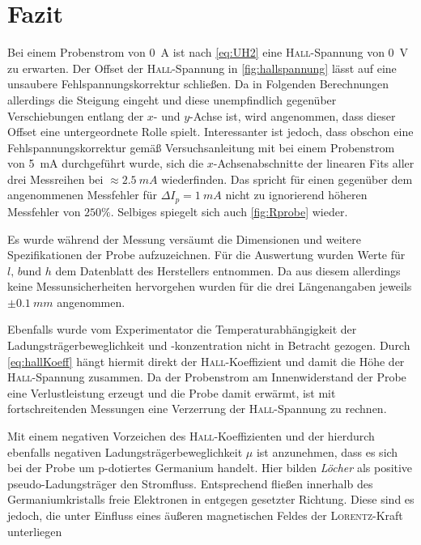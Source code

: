 \chapter{Fazit}
Bei einem Probenstrom von \SI{0}{A} ist nach \cref{eq:UH2} eine \textsc{Hall}-Spannung von \SI{0}{V} zu erwarten. Der Offset
der \textsc{Hall}-Spannung in \cref{fig:hallspannung} lässt auf eine unsaubere Fehlspannungskorrektur schließen. Da in Folgenden
Berechnungen allerdings die Steigung eingeht und diese unempfindlich gegenüber Verschiebungen entlang der \(x\)- und \(y\)-Achse
ist, wird angenommen, dass dieser Offset eine untergeordnete Rolle spielt. Interessanter ist jedoch, dass obschon eine
Fehlspannungskorrektur gemäß Versuchsanleitung mit bei einem Probenstrom von \SI{5}{mA} durchgeführt wurde, sich die
\(x\)-Achsenabschnitte der linearen Fits aller drei Messreihen bei \(\approx \SI{2,5}{mA}\) wiederfinden. Das spricht für
einen gegenüber dem angenommenen Messfehler für \(\Delta I_p = \SI{1}{mA}\) nicht zu ignorierend höheren Messfehler von
\(250\%\). Selbiges spiegelt sich auch \cref{fig:Rprobe} wieder.
\par\medskip
Es wurde während der Messung versäumt die Dimensionen und weitere Spezifikationen der Probe aufzuzeichnen. Für die Auswertung
wurden Werte für \(l\text{, }b\text{und }h\) dem Datenblatt des Herstellers \autocite{PHYWESystemeGmbHundCo.KG.} entnommen.
Da aus diesem allerdings keine Messunsicherheiten hervorgehen wurden für die drei Längenangaben jeweils \(\pm\SI{0,1}{mm}\)
angenommen.
\par
Ebenfalls wurde vom Experimentator die Temperaturabhängigkeit der Ladungsträgerbeweglichkeit und -konzentration nicht in
Betracht gezogen. Durch \cref{eq:hallKoeff} hängt hiermit direkt der \textsc{Hall}-Koeffizient und damit die Höhe der \textsc{Hall}-Spannung
zusammen. Da der Probenstrom am Innenwiderstand der Probe eine Verlustleistung erzeugt und die Probe damit erwärmt, ist
mit fortschreitenden Messungen eine Verzerrung der \textsc{Hall}-Spannung zu rechnen.
\par\medskip
Mit einem negativen Vorzeichen des \textsc{Hall}-Koeffizienten und der hierdurch ebenfalls negativen Ladungsträgerbeweglichkeit
\(\mu\) ist anzunehmen, dass es sich bei der Probe um p-dotiertes Germanium handelt. Hier bilden \textit{Löcher} als positive
pseudo-Ladungsträger den Stromfluss. Entsprechend fließen innerhalb des Germaniumkristalls freie Elektronen in entgegen gesetzter
Richtung. Diese sind es jedoch, die unter Einfluss eines äußeren magnetischen Feldes der \textsc{Lorentz}-Kraft unterliegen
